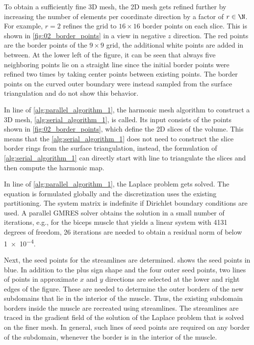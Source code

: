 To obtain a sufficiently fine 3D mesh, the 2D mesh gets refined further by increasing the number of elements per coordinate direction by a factor of $r\in \N$. For example, $r=2$ refines the grid to $16 \times 16$ border points on each slice. This is shown in \cref{fig:02_border_points} in a view in negative $z$ direction. The red points are the border points of the $9 \times 9$ grid, the additional white points are added in between. At the lower left of the figure, it can be seen that always five neighboring points lie on a straight line since the initial border points were refined two times by taking center points between existing points. The border points on the curved outer boundary were instead sampled from the surface triangulation and do not show this behavior.

In line  of \cref{alg:parallel_algorithm_1}, the harmonic mesh algorithm to construct a 3D mesh, \cref{alg:serial_algorithm_1}, is called. Its input consists of the points shown in \cref{fig:02_border_points}, which define the 2D slices of the volume. This means that the \cref{alg:serial_algorithm_1} does not need to construct the slice border rings from the surface triangulation, instead, the formulation of \cref{alg:serial_algorithm_1} can directly start with line  to triangulate the slices and then compute the harmonic map.


In line  of \cref{alg:parallel_algorithm_1}, the Laplace problem gets solved. The equation is formulated globally and the discretization uses the existing partitioning. The system matrix is indefinite if Dirichlet boundary conditions are used. A parallel GMRES solver obtains the solution in a small number of iterations, e.g., for the biceps muscle that yields a linear system with 4131 degrees of freedom, 26 iterations are needed to obtain a residual norm of below \num{1e-4}.

Next, the seed points for the streamlines are determined.  shows the seed points in blue. In addition to the plus sign shape and the four outer seed points, two lines of points in approximate $x$ and $y$ directions are selected at the lower and right edges of the figure. These are needed to determine the outer borders of the new subdomains that lie in the interior of the muscle. Thus, the existing subdomain borders inside the muscle are recreated using streamlines. The streamlines are traced in the gradient field of the solution of the Laplace problem that is solved on the finer mesh. In general, such lines of seed points are required on any border of the subdomain, whenever the border is in the interior of the muscle.

